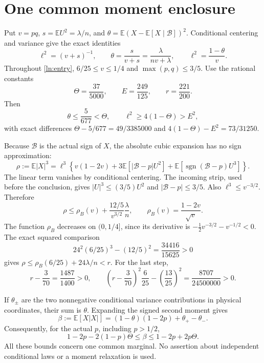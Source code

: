 \documentclass[11pt]{article}
\newcommand{\E}{\mathbb E}\newcommand{\Pp}{\mathbb P}
\begin{document}
\section{One common moment enclosure}
Put $v=pq$, $s=\E U^2=\lambda/n$, and
$\theta=\E(X-\E[X\mid\mathcal B])^2$. Conditional centering and variance
give the exact identities
\begin{equation}\label{ln:identities}
 \ell^2=(v+s)^{-1},\qquad
 \theta=\frac{s}{v+s}=\frac{\lambda}{nv+\lambda},\qquad
 \ell^2=\frac{1-\theta}{v}.
\end{equation}
Throughout \eqref{ln:entry}, $6/25\le v\le1/4$ and
$\max(p,q)\le3/5$. Use the rational constants
\[
 \Theta=\frac{37}{5000},\qquad E=\frac{249}{125},\qquad
 r=\frac{221}{200}.
\]
Then
\[
 \theta\le\frac{5}{677}<\Theta,\qquad
 \ell^2\ge4(1-\Theta)>E^2,
\]
with exact differences
$\Theta-5/677=49/3385000$ and $4(1-\Theta)-E^2=73/31250$.

Because $\mathcal B$ is the actual sign of $X$, the absolute cubic
expansion has no sign approximation:
\begin{equation}\label{ln:cubic}
 \rho:=\E|X|^3=\ell^3\left\{v(1-2v)
       +3\E[|\mathcal B-p|U^2]
       +\E[\operatorname{sgn}(\mathcal B-p)U^3]\right\}.
\end{equation}
The linear term vanishes by conditional centering. The incoming strip,
used before the conclusion, gives $|U|^3\le(3/5)U^2$ and
$|\mathcal B-p|\le3/5$. Also $\ell^3\le v^{-3/2}$. Therefore
\[
 \rho\le\rho_B(v)+\frac{12/5}{v^{3/2}}\frac\lambda n,
 \qquad \rho_B(v)=\frac{1-2v}{\sqrt v}.
\]
The function $\rho_B$ decreases on $(0,1/4]$, since its derivative is
$-\tfrac12v^{-3/2}-v^{-1/2}<0$. The exact squared comparison
\[
 24^2(6/25)^3-(12/5)^2=\frac{34416}{15625}>0
\]
gives $\rho\le\rho_B(6/25)+24\lambda/n<r$. For the last step,
\[
 r-\frac3{70}=\frac{1487}{1400}>0,\qquad
 \left(r-\frac3{70}\right)^2\frac6{25}
       -\left(\frac{13}{25}\right)^2=\frac{8707}{24500000}>0.
\]

If $\theta_\pm$ are the two nonnegative conditional variance contributions
in physical coordinates, their sum is $\theta$. Expanding the signed
second moment gives
\[
 \beta:=\E[X|X|]=(1-\theta)(1-2p)+\theta_+-\theta_-.
\]
Consequently, for the actual $p$, including $p>1/2$,
\begin{equation}\label{ln:beta}
 1-2p-2(1-p)\Theta\le\beta\le1-2p+2p\Theta.
\end{equation}
All these bounds concern one common marginal. No assertion about
independent conditional laws or a moment relaxation is used.
\end{document}
